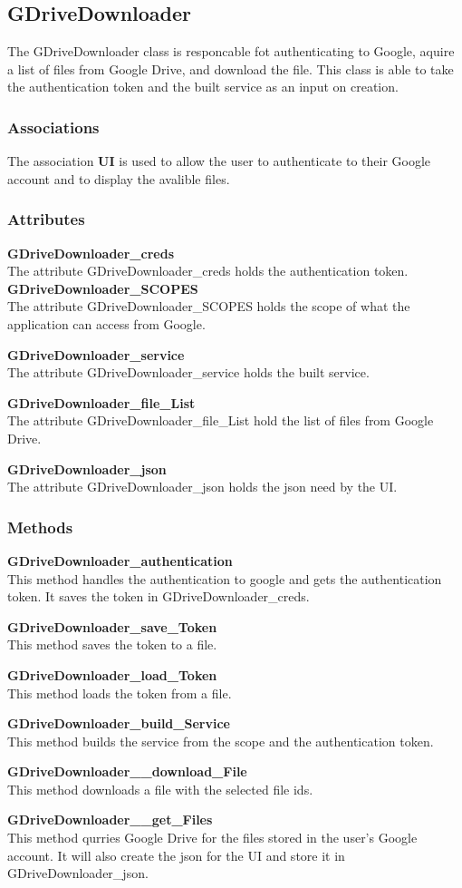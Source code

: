 
\subsection{GDriveDownloader}
The GDriveDownloader class is responcable fot authenticating to Google, aquire a list of files from Google Drive, and download the file.
This class is able to take the authentication token and the built service as an input on creation.  
​
\subsubsection{Associations}
The association \textbf{UI} is used to allow the user to authenticate to their Google account and to display the avalible files.
​
​
\subsubsection{Attributes}
\textbf{GDriveDownloader_creds} \\
The attribute GDriveDownloader_creds holds the authentication token.
​
\textbf{GDriveDownloader_SCOPES} \\
The attribute GDriveDownloader_SCOPES holds the scope of what the application can access from Google.

\textbf{GDriveDownloader_service} \\
The attribute GDriveDownloader_service holds the built service.

\textbf{GDriveDownloader_file_List} \\
The attribute GDriveDownloader_file_List hold the list of files from Google Drive.

\textbf{GDriveDownloader_json} \\
The attribute GDriveDownloader_json holds the json need by the UI. 
​
\subsubsection{Methods}
\textbf{GDriveDownloader_authentication} \\
This method handles the authentication to google and gets the authentication token. It saves the token in GDriveDownloader_creds.

\textbf{GDriveDownloader_save_Token} \\
This method saves the token to a file.

\textbf{GDriveDownloader_load_Token} \\
This method loads the token from a file.

\textbf{GDriveDownloader_build_Service} \\
This method builds the service from the scope and the authentication token.

\textbf{GDriveDownloader__download_File} \\
This method downloads a file with the selected file ids. 

\textbf{GDriveDownloader__get_Files} \\
This method qurries Google Drive for the files stored in the user's Google account. It will also create the json for the UI and store it in GDriveDownloader_json.   